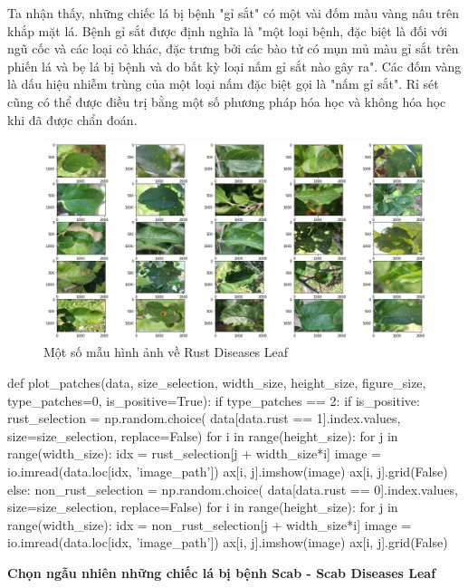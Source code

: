 \documentclass{article}
\begin{document}
	Ta nhận thấy, những chiếc lá bị bệnh "gỉ sắt" có một vài đốm màu vàng nâu trên khắp mặt lá. Bệnh gỉ sắt được định nghĩa là "một loại bệnh, đặc biệt là đối với ngũ cốc và các loại cỏ khác, đặc trưng bởi các bào tử có mụn mủ màu gỉ sắt trên phiến lá và bẹ lá bị bệnh và do bất kỳ loại nấm gỉ sắt nào gây ra". Các đốm vàng là dấu hiệu nhiễm trùng của một loại nấm đặc biệt gọi là "nấm gỉ sắt". Rỉ sét cũng có thể được điều trị bằng một số phương pháp hóa học và không hóa học khi đã được chẩn đoán.
	\begin{figure}[H]
		\centering
		\includegraphics[width=1\linewidth]{images/sample_rust_leaf.png}
		\caption{Một số mẫu hình ảnh về Rust Diseases Leaf}
		\label{fig:writing-thesis}
	\end{figure}
	\begin{python}
		def plot_patches(data, size_selection, width_size, height_size, figure_size, type_patches=0, is_positive=True):
			if type_patches == 2:
				if is_positive:
					rust_selection = np.random.choice(
					data[data.rust == 1].index.values, size=size_selection, replace=False)
					for i in range(height_size):
						for j in range(width_size):
							idx = rust_selection[j + width_size*i]
							image = io.imread(data.loc[idx, 'image_path'])
							ax[i, j].imshow(image)
							ax[i, j].grid(False)
				else:
					non_rust_selection = np.random.choice(
					data[data.rust == 0].index.values, size=size_selection, replace=False)
					for i in range(height_size):
						for j in range(width_size):
							idx = non_rust_selection[j + width_size*i]
							image = io.imread(data.loc[idx, 'image_path'])
							ax[i, j].imshow(image)
							ax[i, j].grid(False)
	\end{python}
	\textbf{Chọn ngẫu nhiên những chiếc lá bị bệnh Scab - Scab Diseases Leaf}
	
\end{document}
